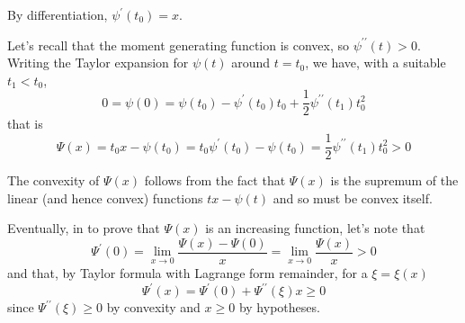 \documentclass[12pt]{article}
\begin{document}
By differentiation, $\psi ^{\prime }(t_{0})=x$.

Let's recall that the moment generating function is convex, so $\psi
^{\prime \prime }(t)>0$. Writing the Taylor expansion for $\psi (t)$
around  $t=t_{0}$, we have, with a suitable $t_1<t_{0}$,
\[
0=\psi (0)=\psi (t_{0})-\psi ^{\prime }(t_{0})t_{0}+\frac{1}{2}\psi ^{\prime
\prime }(t_{1})t_{0}^{2}
\]
that is
\[
\Psi (x)=t_{0}x-\psi (t_{0})=t_{0}\psi ^{\prime }(t_{0})-\psi (t_{0})=\frac{1%
}{2}\psi ^{\prime \prime }(t_{1})t_{0}^{2}>0
\]

The convexity of $\Psi (x)$ follows from the fact that $\Psi (x)$ is the supremum of the linear (and hence convex) functions ${tx-\psi (t)}$ and so must be convex itself.

Eventually, in  to prove that $ \Psi (x)$ is an increasing function, let's note that
\[
\Psi ^{\prime }(0)=\lim_{x\rightarrow 0}\frac{\Psi (x)-\Psi (0)}{x}%
=\lim_{x\rightarrow 0}\frac{\Psi (x)}{x}>0
\]
and that, by Taylor formula with Lagrange form remainder, for a $\xi=\xi(x)$
\[
\Psi ^{\prime }(x)=\Psi ^{\prime }(0)+\Psi ^{\prime \prime }(\xi )x\geq 0
\]
since $\Psi ^{\prime \prime }(\xi )\geq 0$ by convexity and $x\geq 0$ by
hypotheses.
\end{document}
